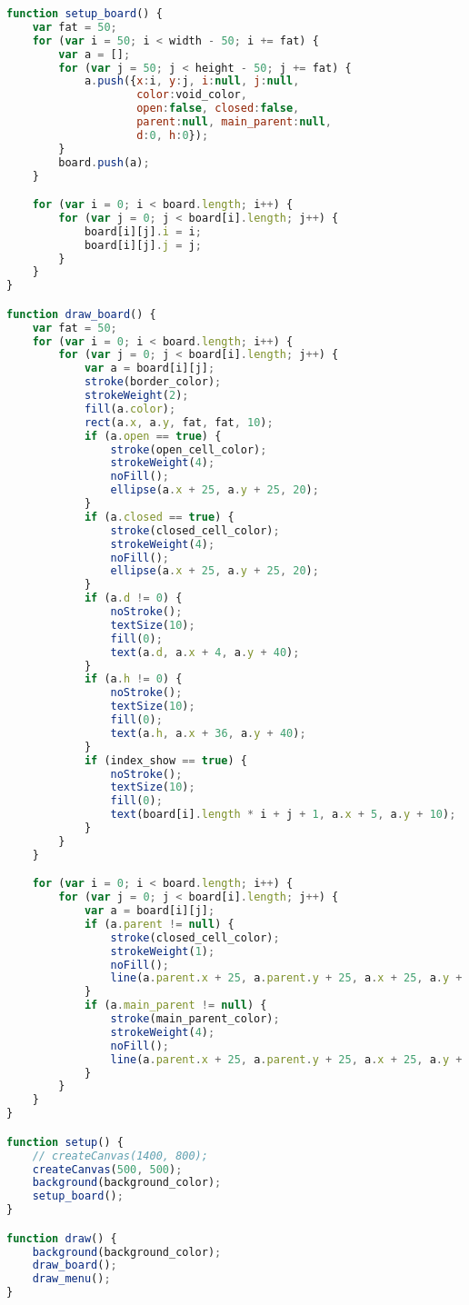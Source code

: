 \begin{lstlisting}[language=Javascript]
function setup_board() {
	var fat = 50;
	for (var i = 50; i < width - 50; i += fat) {
		var a = [];
		for (var j = 50; j < height - 50; j += fat) {
			a.push({x:i, y:j, i:null, j:null,
					color:void_color,
					open:false, closed:false,
					parent:null, main_parent:null,
					d:0, h:0});
		}
		board.push(a);
	}

	for (var i = 0; i < board.length; i++) {
		for (var j = 0; j < board[i].length; j++) {
			board[i][j].i = i;
			board[i][j].j = j;
		}
	}
}

function draw_board() {
	var fat = 50;
	for (var i = 0; i < board.length; i++) {
		for (var j = 0; j < board[i].length; j++) {
			var a = board[i][j];
			stroke(border_color);
			strokeWeight(2);
			fill(a.color);
			rect(a.x, a.y, fat, fat, 10);
			if (a.open == true) {
				stroke(open_cell_color);
				strokeWeight(4);
				noFill();
				ellipse(a.x + 25, a.y + 25, 20);
			}
			if (a.closed == true) {
				stroke(closed_cell_color);
				strokeWeight(4);
				noFill();
				ellipse(a.x + 25, a.y + 25, 20);
			}
			if (a.d != 0) {
				noStroke();
				textSize(10);
				fill(0);
				text(a.d, a.x + 4, a.y + 40);
			}
			if (a.h != 0) {
				noStroke();
				textSize(10);
				fill(0);
				text(a.h, a.x + 36, a.y + 40);
			}
			if (index_show == true) {
				noStroke();
				textSize(10);
				fill(0);
				text(board[i].length * i + j + 1, a.x + 5, a.y + 10);
			}
		}
	}

	for (var i = 0; i < board.length; i++) {
		for (var j = 0; j < board[i].length; j++) {
			var a = board[i][j];
			if (a.parent != null) {
				stroke(closed_cell_color);
				strokeWeight(1);
				noFill();
				line(a.parent.x + 25, a.parent.y + 25, a.x + 25, a.y + 25);
			}
			if (a.main_parent != null) {
				stroke(main_parent_color);
				strokeWeight(4);
				noFill();
				line(a.parent.x + 25, a.parent.y + 25, a.x + 25, a.y + 25);
			}
		}
	}
}

function setup() {
	// createCanvas(1400, 800);
	createCanvas(500, 500);
	background(background_color);
	setup_board();
}

function draw() {
	background(background_color);
	draw_board();
	draw_menu();
}
\end{lstlisting}

